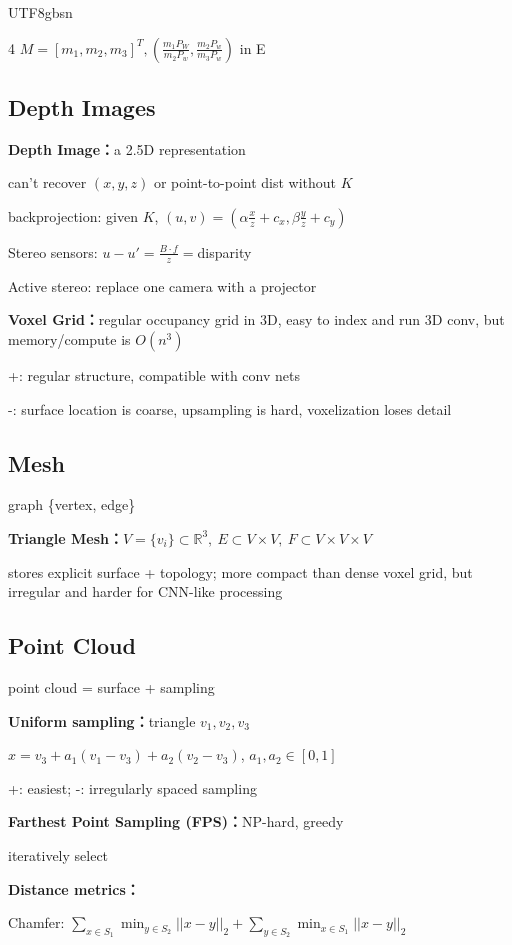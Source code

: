 \documentclass[8pt,a4paper]{extarticle}
\newcommand{\entry}[1]{\vspace{3pt}\noindent\textbf{#1：}}
\begin{document}
\begin{CJK*}{UTF8}{gbsn}
\begin{multicols*}{4}
$M = [m_1, m_2, m_3]^T, (\frac{m_1P_W}{m_2P_w}, \frac{m_2P_w}{m_3P_w})$ in E

\subsection*{Depth Images}

\entry{Depth Image}a 2.5D representation

can't recover $(x,y,z)$ or point-to-point dist without $K$

backprojection: given $K$, $(u,v) = (\alpha\frac{x}{z}+c_x, \beta\frac{y}{z}+c_y)$

Stereo sensors: $u-u' = \frac{B\cdot f}{z} = $disparity

Active stereo: replace one camera with a projector

\entry{Voxel Grid}regular occupancy grid in 3D, easy to index and run 3D conv, but memory/compute is $O(n^3)$

+: regular structure, compatible with conv nets

-: surface location is coarse, upsampling is hard, voxelization loses detail

\subsection*{Mesh}

graph \{vertex, edge\}

\entry{Triangle Mesh}$V=\{v_i\}\subset \mathbb{R}^3,\ E\subset V\times V,\ F\subset V\times V\times V$

stores explicit surface + topology; more compact than dense voxel grid, but irregular and harder for CNN-like processing

\subsection*{Point Cloud}

point cloud = surface + sampling

\entry{Uniform sampling}triangle $v_1, v_2, v_3$

$x = v_3 + a_1(v_1-v_3)+ a_2(v_2-v_3)$, $a_1, a_2 \in [0,1]$

+: easiest; -: irregularly spaced sampling

\entry{Farthest Point Sampling (FPS)}NP-hard, greedy

iteratively select

\entry{Distance metrics}

Chamfer: $\displaystyle\sum_{x \in S_1}\displaystyle\min_{y \in S_2}||x-y||_2 + \displaystyle\sum_{y \in S_2}\displaystyle\min_{x \in S_1}||x-y||_2$


\end{multicols*}
\end{CJK*}
\end{document}
